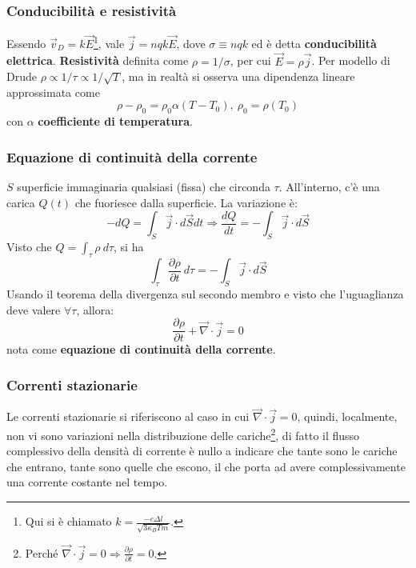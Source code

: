 \documentclass[10pt, a4paper]{scrartcl}
\numberwithin{equation}{subsection}
\theoremstyle{style1}
\begin{document}
\subsubsection{Conducibilit\`a e resistivit\`a}

Essendo $\vec{v}_D = k \vec{E}$\footnote{Qui si \`e chiamato $k = \frac{-e \Delta l}{\sqrt{3\kappa _B T m } }$.}, vale $\vec{j}= nqk \vec{E}$, dove $\sigma \equiv nq k$ ed \`e detta \textbf{conducibilit\`a elettrica}. \textbf{Resistivit\`a} definita come $\rho = 1 / \sigma $, per cui $\vec{E} = \rho  \vec{j}$. Per modello di Drude $\rho  \propto 1 / \tau \propto 1 / \sqrt{T} $, ma in realt\`a si osserva una dipendenza lineare approssimata come
\begin{equation}
	\rho  - \rho_0 = \rho_0 \alpha  (T-T_0), \ \rho_0 = \rho (T_0)
\end{equation}
con $\alpha $ \textbf{coefficiente di temperatura}. 

\subsubsection{Equazione di continuit\`a della corrente}

$S$ superficie immaginaria qualsiasi (fissa) che circonda $\tau $. All'interno, c'\`e una carica $Q(t)$ che fuoriesce dalla superficie. La variazione \`e:
\begin{equation}
	-dQ = \int_{S} \vec{j}\cdot d\vec{S}dt \Rightarrow \frac{d Q}{d t} = - \int_{S} \vec{j}\cdot d\vec{S}
\end{equation}
Visto che $Q = \int_{\tau } \rho  \ d\tau $, si ha
\begin{equation}
	\int_{\tau } \frac{\partial \rho }{\partial t} \ d\tau = - \int_{S} \vec{j}\cdot d\vec{S}
\end{equation}
Usando il teorema della divergenza sul secondo membro e visto che l'uguaglianza deve valere $\forall \tau $, allora:
\begin{equation}
	\frac{\partial \rho }{\partial t}  + \vec{\nabla }\cdot \vec{j} = 0
\end{equation}
nota come \textbf{equazione di continuit\`a della corrente}.

\subsubsection{Correnti stazionarie}

Le correnti stazionarie si riferiscono al caso in cui $\vec{\nabla }\cdot  \vec{j} = 0$, quindi, localmente, non vi sono variazioni nella distribuzione delle cariche\footnote{Perch\'e $\vec{\nabla }\cdot \vec{j} = 0 \Rightarrow  \frac{\partial \rho }{\partial t}  = 0 $.}, di fatto il flusso complessivo della densit\`a di corrente \`e nullo a indicare che tante sono le cariche che entrano, tante sono quelle che escono, il che porta ad avere complessivamente una corrente costante nel tempo.
\end{document}
